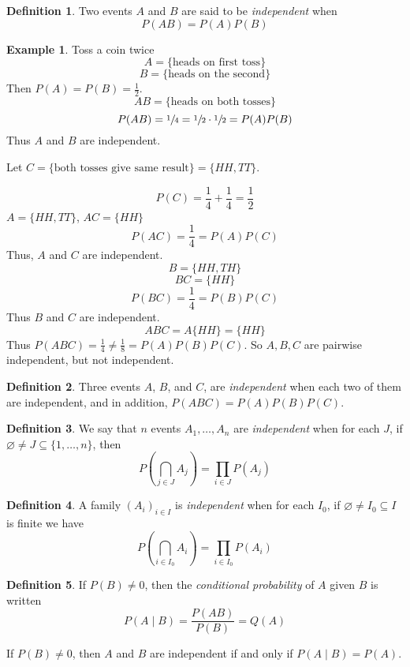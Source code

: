 \documentclass{article}
\newcommand{\p}[1]{\left(#1\right)} %
\theoremstyle{definition}
\newtheorem*{example}{Example}
\newtheorem*{definition}{Definition}
\begin{document}
\begin{definition}
Two events $A$ and $B$ are said to be \emph{independent} when 
$$P(AB) = P(A)P(B)$$
\end{definition}

\begin{example}
Toss a coin twice
$$A =\{\text{heads on first toss}\}$$
$$B=\{\text{heads on the second}\}$$
Then $P(A) = P(B) = \frac{1}{2}$.
\[
    AB = \{\text{heads on both tosses}\}
\]
\[
    P(AB) = \sfrac{1}{4} = \sfrac{1}{2} \cdot \sfrac{1}{2} = P(A)P(B)
\]
Thus $A$ and $B$ are independent.

Let $C = \{\text{both tosses give same result}\} = \{HH, TT\}$.

$$P(C) = \frac{1}{4} + \frac{1}{4} = \frac{1}{2}$$
$A = \{HH, TT\}$, $AC =\{HH\}$
$$P(AC) = \frac{1}{4} = P(A)P(C)$$
Thus, $A$ and $C$ are independent. 
$$B = \{HH, TH\}$$
$$BC = \{HH\}$$
$$P(BC) = \frac{1}{4} = P(B)P(C)$$
Thus $B$ and $C$ are independent. 
$$ABC = A\{HH\}=\{HH\}$$
Thus $P(ABC) = \frac{1}{4}\neq\frac{1}{8}=P(A)P(B)P(C)$.
So $A, B, C$ are pairwise independent, but not independent.
\end{example}

\begin{definition}
Three events $A$, $B$, and $C$, are \emph{independent} when each two of them are independent, and in addition, $P(ABC)=P(A)P(B)P(C)$.
\end{definition}

\begin{definition}
We say that $n$ events $A_1,\dots, A_n$ are \emph{independent} when for each $J$, if $\varnothing \neq J \subseteq\{1,\dots,n\}$, then
$$P(\bigcap_{j\in J}A_j) = \prod_{i\in J}P(A_j)$$
\end{definition}
\begin{definition}
A family $(A_i)_{i \in I}$ is \emph{independent} when for each $I_0$, if $\varnothing \neq I_0 \subseteq I$ is finite we have
\[
    P\p{\bigcap_{i \in I_0} A_i} = \prod_{i \in I_0} P(A_i)
\]
\end{definition}

\begin{definition}
If $P(B)\neq 0$, then the \emph{conditional probability} of $A$ given $B$ is written
$$P(A\mid B) = \frac{P(AB)}{P(B)}=Q(A)$$
\end{definition}
If $P(B) \neq 0$, then $A$ and $B$ are independent if and only if $P(A \mid B) = P(A)$.
\end{document}

